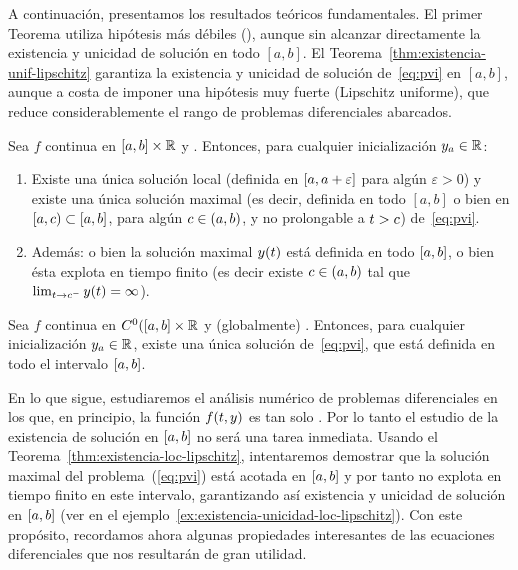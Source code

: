 A continuación, presentamos los resultados teóricos fundamentales. El
primer Teorema utiliza hipótesis más débiles (\locLipschitz), aunque
sin alcanzar directamente la existencia y unicidad de solución en todo
$[a,b]$.  El Teorema~\ref{thm:existencia-unif-lipschitz} garantiza la
existencia y unicidad de solución de~\eqref{eq:pvi} en $[a,b]$,
aunque a costa de imponer una hipótesis muy fuerte (Lipschitz
uniforme), que reduce considerablemente el rango de problemas
diferenciales abarcados.
\begin{theorem}
  \label{thm:existencia-loc-lipschitz}
  Sea $f$ continua en $[\ta,\tb]\times\Rset$ y \locLipschitz. Entonces, para
  cualquier inicialización $\ycero\in\Rset$:
  \begin{enumerate}
  \item Existe una única solución local (definida en
    $[\ta,\ta+\varepsilon]$ para algún $\varepsilon>0$) y existe una
    única solución maximal (es decir, definida en todo $[a,b]$ o bien
    en $[\ta,c)\subset[\ta,\tb]$, para algún $c\in(\ta,\tb)$, y no
    prolongable a $\tt>c$) de~\eqref{eq:pvi}.
  \item Además: o bien la solución maximal $\sol(\tt)$  está definida en todo
    $[\ta,\tb]$, o bien ésta explota en tiempo finito (es decir existe
    $c\in (\ta,\tb)$ tal que $\lim_{\tt\to c^-} \sol(\tt) = \infty$).
  \end{enumerate}
\end{theorem}

\begin{theorem}[Picard]
  \label{thm:existencia-unif-lipschitz}
  Sea $f$ continua en $C^0([\ta,\tb]\times\Rset$ y (globalmente) \globLipschitz.
  Entonces, para cualquier inicialización $\ycero\in\Rset$, existe una
  única solución de~\eqref{eq:pvi}, que está definida en todo el
  intervalo $[\ta,\tb]$.%
\end{theorem}

En lo que sigue, estudiaremos el análisis numérico de problemas
diferenciales en los que, en principio, la función $f(\tt,y)$ es tan
solo \locLipschitz. Por lo tanto el estudio de la existencia de
solución en $[\ta,\tb]$ no será una tarea inmediata. Usando el
Teorema~\ref{thm:existencia-loc-lipschitz}, intentaremos demostrar que
la solución maximal del problema~(\ref{eq:pvi}) está acotada en
$[\ta,\tb]$ y por tanto no explota en tiempo finito en este intervalo,
garantizando así existencia y unicidad de solución en $[\ta,\tb]$ (ver
en el ejemplo~\ref{ex:existencia-unicidad-loc-lipschitz}). Con este
propósito, recordamos ahora algunas propiedades interesantes de las
ecuaciones diferenciales que nos resultarán de gran utilidad.


